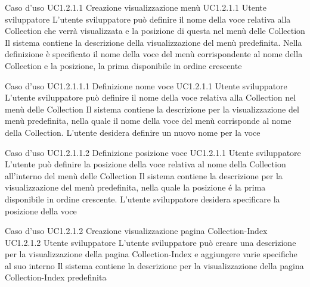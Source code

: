 \UCtitle
{Caso d'uso UC1.2.1.1}
{Creazione visualizzazione menù}
\UC
{UC1.2.1.1}
{Utente sviluppatore}
{L'utente sviluppatore può definire il nome della voce relativa alla Collection che verrà visualizzata e la posizione di questa nel menù delle Collection}
{Il sistema contiene la descrizione della visualizzazione del menù predefinita. Nella definizione è specificato il nome della voce del menù corrispondente al nome della Collection e la posizione, la prima disponibile in ordine crescente}

\UCtitle
{Caso d'uso UC1.2.1.1.1}
{Definizione nome voce}
\UC
{UC1.2.1.1}
{Utente sviluppatore}
{L'utente sviluppatore può definire il nome della voce relativa alla Collection nel menù delle Collection}
{Il sistema contiene la descrizione per la visualizzazione del menù predefinita, nella quale il nome della voce del menù corrisponde al nome della Collection. L'utente desidera definire un nuovo nome per la voce}

\UCtitle
{Caso d'uso UC1.2.1.1.2}
{Definizione posizione voce}
\UC
{UC1.2.1.1}
{Utente sviluppatore}
{L'utente può definire la posizione della voce relativa al nome della Collection all'interno del menù delle Collection }
{Il sistema contiene la descrizione per la visualizzazione del menù predefinita, nella quale la posizione \'e la prima disponibile in ordine crescente. L'utente sviluppatore desidera specificare la posizione della voce}



\UCtitle
{Caso d'uso UC1.2.1.2}
{Creazione visualizzazione pagina Collection-Index}
\UC
{UC1.2.1.2}
{Utente sviluppatore}
{L'utente sviluppatore  può creare una descrizione per la visualizzazione della pagina Collection-Index e aggiungere varie specifiche al suo interno}
{Il sistema contiene la descrizione per la visualizzazione della pagina Collection-Index predefinita}


